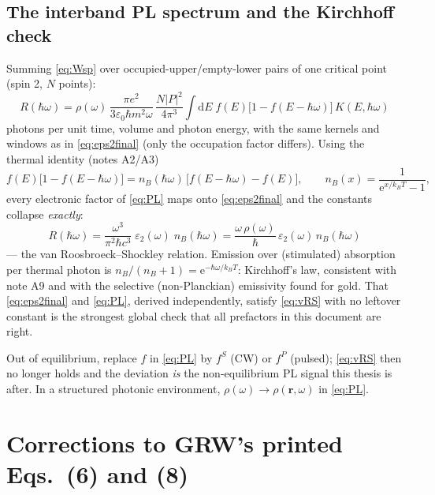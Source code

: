\documentclass[11pt,a4paper]{article}
\numberwithin{equation}{section}
\newcommand{\hw}{\hbar\omega}
\newcommand{\eps}{\varepsilon}
\newcommand{\epsz}{\varepsilon_0}
\newcommand{\dd}{\mathrm{d}}
\newcommand{\fFD}{f}
\newcommand{\kB}{k_B}
\newcommand{\rme}{\mathrm{e}}
\begin{document}
\subsection{The interband PL spectrum and the Kirchhoff check}

Summing \eqref{eq:Wsp} over occupied-upper/empty-lower pairs of one
critical point (spin 2, $N$ points):
\begin{equation}
\boxed{\;
R(\hw)=\rho(\omega)\,\frac{\pi e^2}{3\epsz\hbar m^2\omega}\,
\frac{N|P|^2}{4\pi^3}\int\!\dd E\;
\fFD(E)\bigl[1-\fFD(E-\hw)\bigr]\,K(E,\hw)
\;}
\label{eq:PL}
\end{equation}
photons per unit time, volume and photon energy, with the same kernels
and windows as in \eqref{eq:eps2final} (only the occupation factor
differs).  Using the thermal identity (notes A2/A3)
\begin{equation}
\fFD(E)\bigl[1-\fFD(E-\hw)\bigr]
=n_B(\hw)\,\bigl[\fFD(E-\hw)-\fFD(E)\bigr],
\qquad n_B(x)=\frac{1}{\rme^{x/\kB T}-1},
\end{equation}
every electronic factor of \eqref{eq:PL} maps onto \eqref{eq:eps2final}
and the constants collapse \emph{exactly}:
\begin{equation}
\boxed{\;
R(\hw)=\frac{\omega^3}{\pi^2\hbar c^3}\;\eps_2(\omega)\;n_B(\hw)
=\frac{\omega\,\rho(\omega)}{\hbar}\,\eps_2(\omega)\,n_B(\hw)
\;}
\label{eq:vRS}
\end{equation}
--- the van Roosbroeck--Shockley relation.  Emission over (stimulated)
absorption per thermal photon is $n_B/(n_B{+}1)=\rme^{-\hw/\kB T}$:
Kirchhoff's law, consistent with note A9 and with the selective
(non-Planckian) emissivity found for gold.  That \eqref{eq:eps2final}
and \eqref{eq:PL}, derived independently, satisfy \eqref{eq:vRS} with
no leftover constant is the strongest global check that all prefactors
in this document are right.

Out of equilibrium, replace $\fFD$ in \eqref{eq:PL} by $f^S$ (CW) or
$f^P$ (pulsed); \eqref{eq:vRS} then no longer holds and the deviation
\emph{is} the non-equilibrium PL signal this thesis is after.  In a
structured photonic environment, $\rho(\omega)\to\rho(\mathbf r,\omega)$
in \eqref{eq:PL}.

\appendix
\section{Corrections to GRW's printed Eqs.\ (6) and (8)}\label{app:grw}
\end{document}
